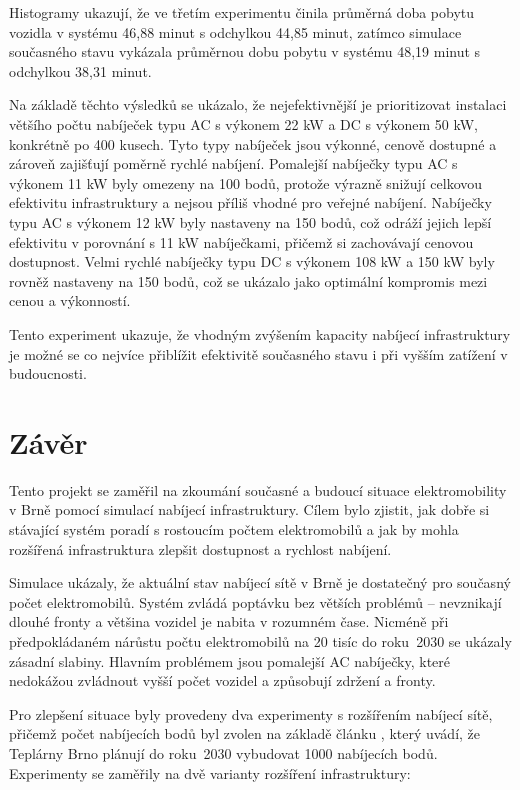 \documentclass[a4paper,11pt]{article}
\begin{document}
Histogramy ukazují, že ve třetím experimentu činila průměrná doba pobytu vozidla v systému 46,88 minut s odchylkou
44,85 minut, zatímco simulace současného stavu vykázala průměrnou dobu pobytu v systému 48,19 minut s odchylkou
38,31 minut.

Na základě těchto výsledků se ukázalo, že nejefektivnější je prioritizovat instalaci většího počtu nabíječek typu AC s
výkonem 22 kW a DC s výkonem 50 kW, konkrétně po 400 kusech. Tyto typy nabíječek jsou výkonné, cenově dostupné a
zároveň zajišťují poměrně rychlé nabíjení. Pomalejší nabíječky typu AC s výkonem 11 kW byly omezeny na 100 bodů,
protože výrazně snižují celkovou efektivitu infrastruktury a nejsou příliš vhodné pro veřejné nabíjení. Nabíječky typu
AC s výkonem 12 kW byly nastaveny na 150 bodů, což odráží jejich lepší efektivitu v porovnání s 11 kW nabíječkami,
přičemž si zachovávají cenovou dostupnost. Velmi rychlé nabíječky typu DC s výkonem 108 kW a 150 kW byly rovněž
nastaveny na 150 bodů, což se ukázalo jako optimální kompromis mezi cenou a výkonností.

Tento experiment ukazuje, že vhodným zvýšením kapacity nabíjecí infrastruktury je možné se co nejvíce přiblížit
efektivitě současného stavu i při vyšším zatížení v budoucnosti.

\section{Závěr}
Tento projekt se zaměřil na zkoumání současné a budoucí situace elektromobility v Brně pomocí simulací nabíjecí
infrastruktury. Cílem bylo zjistit, jak dobře si stávající systém poradí s rostoucím počtem elektromobilů a jak by
mohla rozšířená infrastruktura zlepšit dostupnost a rychlost nabíjení.

Simulace ukázaly, že aktuální stav nabíjecí sítě v Brně je dostatečný pro současný počet elektromobilů. Systém zvládá
poptávku bez větších problémů -- nevznikají dlouhé fronty a většina vozidel je nabita v rozumném čase. Nicméně při
předpokládaném nárůstu počtu elektromobilů na 20 tisíc do roku~2030 se ukázaly zásadní slabiny. Hlavním problémem
jsou pomalejší AC nabíječky, které nedokážou zvládnout vyšší počet vozidel a způsobují zdržení a fronty.

Pro zlepšení situace byly provedeny dva experimenty s rozšířením nabíjecí sítě, přičemž počet nabíjecích bodů byl
zvolen na základě článku \cite{ev_growth}, který uvádí, že Teplárny Brno plánují do roku~2030 vybudovat 1000 nabíjecích
bodů. Experimenty se zaměřily na dvě varianty rozšíření infrastruktury:
\end{document}

